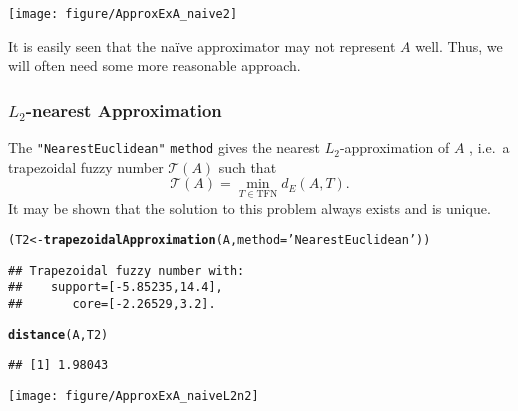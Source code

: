 \documentclass[11pt]{article}\usepackage[]{graphicx}\usepackage[]{color}
\makeatletter
\newcommand{\hlstr}[1]{\textcolor[rgb]{0.192,0.494,0.8}{#1}}%
\newcommand{\hlstd}[1]{\textcolor[rgb]{0.345,0.345,0.345}{#1}}%
\newcommand{\hlkwb}[1]{\textcolor[rgb]{0.69,0.353,0.396}{#1}}%
\newcommand{\hlkwc}[1]{\textcolor[rgb]{0.333,0.667,0.333}{#1}}%
\newcommand{\hlkwd}[1]{\textcolor[rgb]{0.737,0.353,0.396}{\textbf{#1}}}%
\newenvironment{kframe}{%
 \def\at@end@of@kframe{}%
 \ifinner\ifhmode%
  \def\at@end@of@kframe{\end{minipage}}%
  \begin{minipage}{\columnwidth}%
 \fi\fi%
 \def\FrameCommand##1{\hskip\@totalleftmargin \hskip-\fboxsep
 \colorbox{shadecolor}{##1}\hskip-\fboxsep
     \hskip-\linewidth \hskip-\@totalleftmargin \hskip\columnwidth}%
 \MakeFramed {\advance\hsize-\width
   \@totalleftmargin\z@ \linewidth\hsize
   \@setminipage}}%
 {\par\unskip\endMakeFramed%
 \at@end@of@kframe}
\newenvironment{knitrout}{}{} %
\newcommand{\argument}[1]{\texttt{\hlkwc{#1}}}
\newcommand{\str}[1]{\texttt{\hlstr{#1}}}
\makeatother
\begin{document}
\begin{center}
\begin{knitrout}\small
{}\color{fgcolor}

{\centering \texttt{[image: figure/ApproxExA\_naive2]} 

}



\end{knitrout}
\end{center}

It is easily seen that the na\"{i}ve approximator
may not represent $A$ well.
Thus, we will often need some more reasonable
approach.


\subsubsection{$L_2$-nearest Approximation}





The \str{"{}NearestEuclidean"{}} \argument{method}
gives the nearest $L_2$-approximation of $A$
\cite[Corollary 8]{Ban2009:nearestfnrev},
i.e.~a trapezoidal fuzzy number $\mathcal{T}(A)$ such that
\[
\mathcal{T}(A)=\min\limits_{T\in \mathrm{TFN}}d_E(A,T).
\]
It may be shown that the solution to this problem
always exists and is unique.

\begin{knitrout}\small
{}\color{fgcolor}\begin{kframe}
\begin{alltt}
\hlstd{(T2} \hlkwb{<-} \hlkwd{trapezoidalApproximation}\hlstd{(A,} \hlkwc{method}\hlstd{=}\hlstr{'NearestEuclidean'}\hlstd{))}
\end{alltt}
\begin{verbatim}
## Trapezoidal fuzzy number with:
##    support=[-5.85235,14.4],
##       core=[-2.26529,3.2].
\end{verbatim}
\begin{alltt}
\hlkwd{distance}\hlstd{(A, T2)}
\end{alltt}
\begin{verbatim}
## [1] 1.98043
\end{verbatim}
\end{kframe}
\end{knitrout}

\begin{center}
\begin{knitrout}\small
{}\color{fgcolor}

{\centering \texttt{[image: figure/ApproxExA\_naiveL2n2]} 

}



\end{knitrout}
\end{center}
\end{document}
